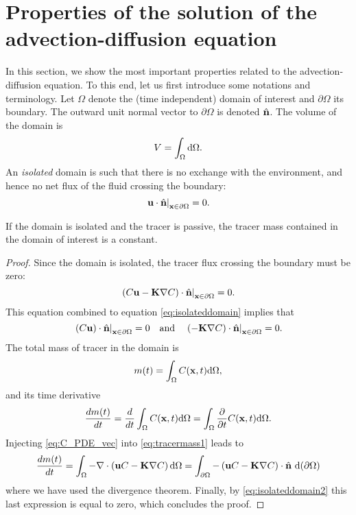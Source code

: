 \section{Properties of the solution of the advection-diffusion equation}
In this section, we show the most important properties related to the advection-diffusion equation. To this end, let us first introduce some notations and terminology. Let $\Omega$ denote the (time independent) domain of interest and $\partial \Omega$ its boundary. The outward unit normal vector to $\partial \Omega$ is denoted $\hat{\b n}$. The volume of the domain is
\begin{equation}
	V = \int_{\Omega} \rm d\Omega.	
\end{equation}
An \textit{isolated} domain is such that there is no exchange with the environment, and hence no net flux of the fluid crossing the boundary:
\begin{equation} \label{eq:isolateddomain}
	\left. \b u \cdot \hat{\b n}\right|_{\b x \in \partial \Omega} = 0.
\end{equation}

\begin{property} \label{prop:mass-is-constant}
	If the domain is isolated and the tracer is passive, the tracer mass contained in the domain of interest is a constant.
\end{property}
\begin{proof}
	Since the domain is isolated, the tracer flux crossing the boundary must be zero:
	\begin{equation} \label{eq:isolateddomain2}
		\left. (C\b u - \b K \nabla C)\cdot \n \right|_{\b x \in \partial \Omega} = 0.
	\end{equation}
	This equation combined to equation \eqref{eq:isolateddomain} implies that
	\begin{equation} \label{eq:isolateddomain3}
		\left. (C\b u)\cdot \n \right|_{\b x \in \partial \Omega} = 0 \quad \mbox{and} \quad \left. (- \b K \nabla C)\cdot \n \right|_{\b x \in \partial \Omega} = 0.
	\end{equation}
	The total mass of tracer in the domain is
	\begin{equation}
		m(t) = \int_{\Omega} C(\b x,t) \rm d\Omega,
	\end{equation}
	and its time derivative
	\begin{equation} \label{eq:tracermass1}
		\frac{dm(t)}{dt} = \frac{d}{dt} \int_{\Omega} C(\b x,t) \rm d\Omega = \int_{\Omega} \frac{\partial}{\partial t} C(\b x,t) \rm d\Omega.
	\end{equation}
	Injecting \eqref{eq:C_PDE_vec} into \eqref{eq:tracermass1} leads to
	\begin{equation}
		\frac{dm(t)}{dt} = \int_{\Omega} -\nabla \cdot \left(\b uC - \b K \nabla C\right) \rm d\Omega = \int_{\partial \Omega} -\left(\b uC - \b K \nabla C\right) \cdot \n \ \rm d(\partial \Omega)
	\end{equation}
	where we have used the divergence theorem. Finally, by \eqref{eq:isolateddomain2} this last expression is equal to zero, which concludes the proof.
\end{proof}

